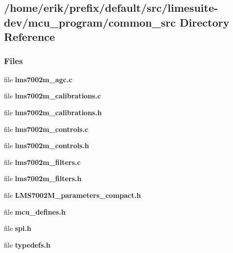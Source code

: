 \subsection{/home/erik/prefix/default/src/limesuite-\/dev/mcu\+\_\+program/common\+\_\+src Directory Reference}
\label{dir_3e3da9cfaef45a36dc97a954306838ae}
\subsubsection*{Files}
\begin{DoxyCompactItemize}
\item 
file {\bf lms7002m\+\_\+agc.\+c}
\item 
file {\bf lms7002m\+\_\+calibrations.\+c}
\item 
file {\bf lms7002m\+\_\+calibrations.\+h}
\item 
file {\bf lms7002m\+\_\+controls.\+c}
\item 
file {\bf lms7002m\+\_\+controls.\+h}
\item 
file {\bf lms7002m\+\_\+filters.\+c}
\item 
file {\bf lms7002m\+\_\+filters.\+h}
\item 
file {\bf L\+M\+S7002\+M\+\_\+parameters\+\_\+compact.\+h}
\item 
file {\bf mcu\+\_\+defines.\+h}
\item 
file {\bf spi.\+h}
\item 
file {\bf typedefs.\+h}
\end{DoxyCompactItemize}
